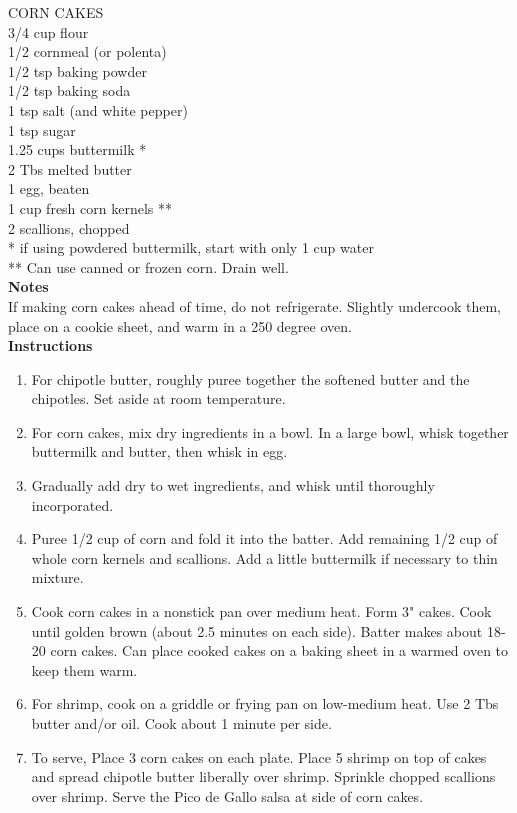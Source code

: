 \documentclass{article}
\numberwithin{figure}{section}
\numberwithin{equation}{section}
\begin{document}
CORN CAKES\\
3/4 cup flour\\
1/2 cornmeal (or polenta)\\
1/2 tsp baking powder\\
1/2 tsp baking soda\\
1 tsp salt (and white pepper)\\
1 tsp sugar\\
1.25 cups buttermilk *\\
2 Tbs melted butter\\
1 egg, beaten\\
1 cup fresh corn kernels **\\
2 scallions, chopped\\

* if using powdered buttermilk, start with only 1 cup water\\
** Can use canned or frozen corn. Drain well.\\

{\bf Notes}\\
If making corn cakes ahead of time, do not refrigerate. Slightly undercook them, place on a cookie sheet, and warm in a 250 degree oven.\\

{\bf Instructions}
\begin{enumerate}
\item For chipotle butter, roughly puree together the softened butter and the chipotles. Set aside at room temperature.
\item For corn cakes, mix dry ingredients in a bowl. In a large bowl, whisk together buttermilk and butter, then whisk in egg.
\item Gradually add dry to wet ingredients, and whisk until thoroughly incorporated.
\item Puree 1/2 cup of corn and fold it into the batter. Add remaining 1/2 cup of whole corn kernels and scallions. Add a little buttermilk if necessary to thin mixture.
\item Cook corn cakes in a nonstick pan over medium heat. Form 3" cakes. Cook until golden brown (about 2.5 minutes on each side). Batter makes about 18-20 corn cakes. Can place cooked cakes on a baking sheet in a warmed oven to keep them warm.
\item For shrimp, cook on a griddle or frying pan on low-medium heat. Use 2 Tbs butter and/or oil. Cook about 1 minute per side.
\item To serve, Place 3 corn cakes on each plate. Place 5 shrimp on top of cakes and spread chipotle butter liberally over shrimp. Sprinkle chopped scallions over shrimp. Serve the Pico de  Gallo salsa at side of corn cakes.
\end{enumerate}
\end{document}
